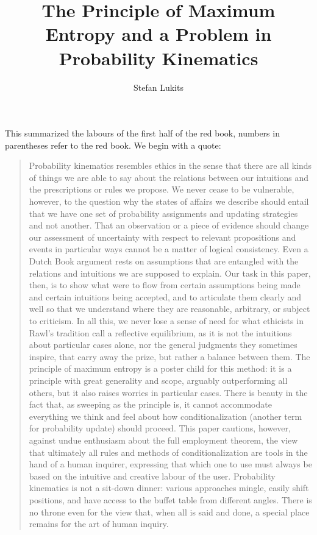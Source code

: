 \documentclass[11pt]{article}
\newenvironment{quotex}{\begin{quote}\begin{footnotesize}}{\end{footnotesize}\end{quote}}
\begin{document}
\title{The Principle of Maximum Entropy and a Problem in Probability Kinematics}

\author{Stefan Lukits}

\maketitle


\setcounter{chap}{1}

This summarized the labours of the first half of the red book, numbers
in parentheses refer to the red book. We begin with a quote:

\begin{quotex} 
  Probability kinematics resembles ethics in the sense that there are
  all kinds of things we are able to say about the relations between
  our intuitions and the prescriptions or rules we propose. We never
  cease to be vulnerable, however, to the question why the states of
  affairs we describe should entail that we have one set of
  probability assignments and updating strategies and not another.
  That an observation or a piece of evidence should change our
  assessment of uncertainty with respect to relevant propositions and
  events in particular ways cannot be a matter of logical consistency.
  Even a Dutch Book argument rests on assumptions that are entangled
  with the relations and intuitions we are supposed to explain. Our
  task in this paper, then, is to show what were to flow from certain
  assumptions being made and certain intuitions being accepted, and to
  articulate them clearly and well so that we understand where they
  are reasonable, arbitrary, or subject to criticism. In all this, we
  never lose a sense of need for what ethicists in Rawl's tradition
  call a reflective equilibrium, as it is not the intuitions about
  particular cases alone, nor the general judgments they sometimes
  inspire, that carry away the prize, but rather a balance between
  them. The principle of maximum entropy is a poster child for this
  method: it is a principle with great generality and scope, arguably
  outperforming all others, but it also raises worries in particular
  cases. There is beauty in the fact that, as sweeping as the
  principle is, it cannot accommodate everything we think and feel
  about how conditionalization (another term for probability update)
  should proceed. This paper cautions, however, against undue
  enthusiasm about the full employment theorem, the view that
  ultimately all rules and methods of conditionalization are tools in
  the hand of a human inquirer, expressing that which one to use must
  always be based on the intuitive and creative labour of the user.
  Probability kinematics is not a sit-down dinner: various approaches
  mingle, easily shift positions, and have access to the buffet table
  from different angles. There is no throne even for the view that,
  when all is said and done, a special place remains for the art of
  human inquiry.
\end{quotex}
\end{document}
